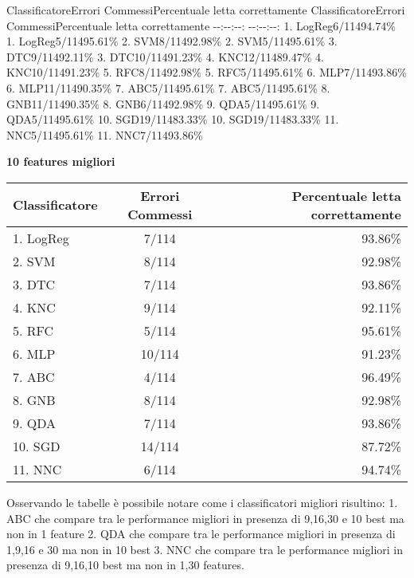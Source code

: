 \documentclass[11pt]{article}
\begin{document}
\textbar{}Classificatore\textbar{}Errori Commessi\textbar{}Percentuale
letta correttamente\textbar{} \textbar{}Classificatore\textbar{}Errori
Commessi\textbar{}Percentuale letta correttamente\textbar{}
\textbar{}-\/-\textbar{}:-\/-:\textbar{}-\/-:\textbar{}
\textbar{}-\/-\textbar{}:-\/-:\textbar{}-\/-:\textbar{} \textbar{}1.
LogReg\textbar{}6/114\textbar{}94.74\%\textbar{} \textbar{}1.
LogReg\textbar{}5/114\textbar{}95.61\%\textbar{} \textbar{}2.
SVM\textbar{}8/114\textbar{}92.98\%\textbar{} \textbar{}2.
SVM\textbar{}5/114\textbar{}95.61\%\textbar{} \textbar{}3.
DTC\textbar{}9/114\textbar{}92.11\%\textbar{} \textbar{}3.
DTC\textbar{}10/114\textbar{}91.23\%\textbar{} \textbar{}4.
KNC\textbar{}12/114\textbar{}89.47\%\textbar{} \textbar{}4.
KNC\textbar{}10/114\textbar{}91.23\%\textbar{} \textbar{}5.
RFC\textbar{}8/114\textbar{}92.98\%\textbar{} \textbar{}5.
RFC\textbar{}5/114\textbar{}95.61\%\textbar{} \textbar{}6.
MLP\textbar{}7/114\textbar{}93.86\%\textbar{} \textbar{}6.
MLP\textbar{}11/114\textbar{}90.35\%\textbar{} \textbar{}7.
ABC\textbar{}5/114\textbar{}95.61\%\textbar{} \textbar{}7.
ABC\textbar{}5/114\textbar{}95.61\%\textbar{} \textbar{}8.
GNB\textbar{}11/114\textbar{}90.35\%\textbar{} \textbar{}8.
GNB\textbar{}6/114\textbar{}92.98\%\textbar{} \textbar{}9.
QDA\textbar{}5/114\textbar{}95.61\%\textbar{} \textbar{}9.
QDA\textbar{}5/114\textbar{}95.61\%\textbar{} \textbar{}10.
SGD\textbar{}19/114\textbar{}83.33\%\textbar{} \textbar{}10.
SGD\textbar{}19/114\textbar{}83.33\%\textbar{} \textbar{}11.
NNC\textbar{}5/114\textbar{}95.61\%\textbar{} \textbar{}11.
NNC\textbar{}7/114\textbar{}93.86\%\textbar{}

\textbf{10 features migliori}

\begin{longtable}[]{@{}lcr@{}}
\toprule
Classificatore & Errori Commessi & Percentuale letta
correttamente\tabularnewline
\midrule
\endhead
1. LogReg & 7/114 & 93.86\%\tabularnewline
2. SVM & 8/114 & 92.98\%\tabularnewline
3. DTC & 7/114 & 93.86\%\tabularnewline
4. KNC & 9/114 & 92.11\%\tabularnewline
5. RFC & 5/114 & 95.61\%\tabularnewline
6. MLP & 10/114 & 91.23\%\tabularnewline
7. ABC & 4/114 & 96.49\%\tabularnewline
8. GNB & 8/114 & 92.98\%\tabularnewline
9. QDA & 7/114 & 93.86\%\tabularnewline
10. SGD & 14/114 & 87.72\%\tabularnewline
11. NNC & 6/114 & 94.74\%\tabularnewline
\bottomrule
\end{longtable}

Osservando le tabelle è possibile notare come i classificatori migliori
risultino: 1. ABC che compare tra le performance migliori in presenza di
9,16,30 e 10 best ma non in 1 feature 2. QDA che compare tra le
performance migliori in presenza di 1,9,16 e 30 ma non in 10 best 3. NNC
che compare tra le performance migliori in presenza di 9,16,10 best ma
non in 1,30 features.
\end{document}
